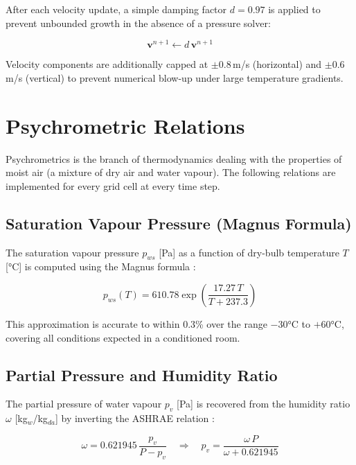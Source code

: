\documentclass[12pt,a4paper]{report}
\begin{document}
After each velocity update, a simple damping factor $d = 0.97$ is applied to prevent unbounded growth in the absence of a pressure solver:

\begin{equation}
  \mathbf{v}^{n+1} \leftarrow d\,\mathbf{v}^{n+1}
  \label{eq:damping}
\end{equation}

Velocity components are additionally capped at $\pm 0.8$\,m/s (horizontal) and $\pm 0.6$\,m/s (vertical) to prevent numerical blow-up under large temperature gradients.

\section{Psychrometric Relations}
\label{sec:psychro}

Psychrometrics is the branch of thermodynamics dealing with the properties of moist air (a mixture of dry air and water vapour). The following relations are implemented for every grid cell at every time step.

\subsection{Saturation Vapour Pressure (Magnus Formula)}
\label{subsec:magnus}

The saturation vapour pressure $p_{ws}$ [Pa] as a function of dry-bulb temperature $T$ [°C] is computed using the Magnus formula \cite{august1828, alduchov1996}:

\begin{equation}
  \boxed{p_{ws}(T) = 610.78\exp\!\left(\frac{17.27\,T}{T + 237.3}\right)}
  \label{eq:magnus}
\end{equation}

This approximation is accurate to within 0.3\% over the range $-30$°C to $+60$°C, covering all conditions expected in a conditioned room.

\subsection{Partial Pressure and Humidity Ratio}
\label{subsec:omega}

The partial pressure of water vapour $p_v$ [Pa] is recovered from the humidity ratio $\omega$ [kg$_w$/kg$_{da}$] by inverting the ASHRAE relation \cite{ashrae2021}:

\begin{equation}
  \omega = 0.621945\,\frac{p_v}{P - p_v} \quad\Longrightarrow\quad p_v = \frac{\omega\,P}{\omega + 0.621945}
  \label{eq:omega}
\end{equation}
\end{document}
